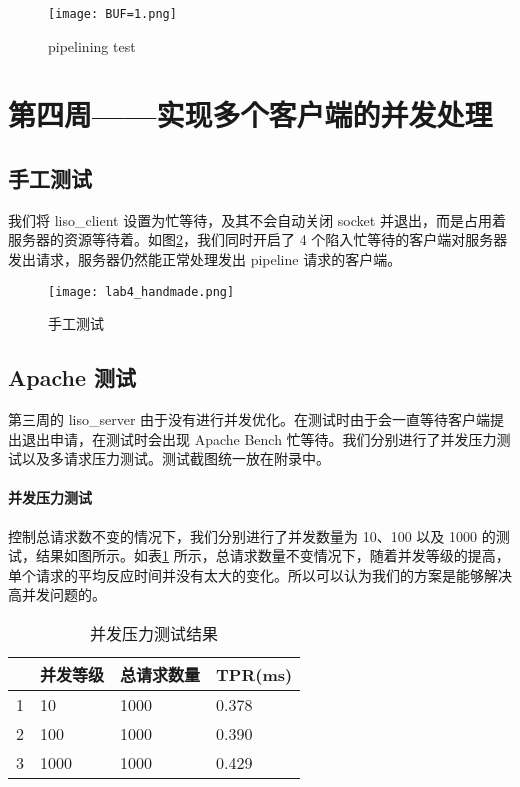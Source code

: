 \begin{figure}[htbp!]
    \centering 
    \texttt{[image: BUF=1.png]}
    \caption{pipelining test}
    \label{fig:pipelining}
\end{figure}


\section{第四周——实现多个客户端的并发处理}

\subsection{手工测试}
我们将 liso\_client 设置为忙等待，及其不会自动关闭 socket 并退出，而是占用着服务器的资源等待着。如图\ref{fig:lab4test1}，我们同时开启了 4 个陷入忙等待的客户端对服务器发出请求，服务器仍然能正常处理发出 pipeline 请求的客户端。


\begin{figure}[htbp!]
    \centering 
    \texttt{[image: lab4\_handmade.png]}
    \caption{手工测试}
    \label{fig:lab4test1}
\end{figure}

\subsection{Apache 测试} \label{sec:apatest}

第三周的 liso\_server 由于没有进行并发优化。在测试时由于会一直等待客户端提出退出申请，在测试时会出现 Apache Bench 忙等待。我们分别进行了并发压力测试以及多请求压力测试。测试截图统一放在附录中。

\paragraph*{并发压力测试} 控制总请求数不变的情况下，我们分别进行了并发数量为 10、100 以及 1000 的测试，结果如图所示。如表\ref{tab:parallel} 所示，总请求数量不变情况下，随着并发等级的提高，单个请求的平均反应时间并没有太大的变化。所以可以认为我们的方案是能够解决高并发问题的。

\begin{table}[htbp!]
    \centering
    \begin{tabular}{llll}\hline
      & 并发等级 & 总请求数量 & TPR(ms)   \\\hline
    1 & 10   & 1000  & 0.378 \\
    2 & 100  & 1000  & 0.390 \\
    3 & 1000 & 1000  & 0.429\\
    \hline
    \end{tabular}
    \caption{并发压力测试结果}\label{tab:parallel}
\end{table}

